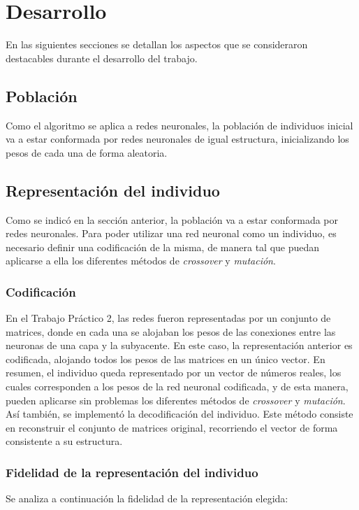 \documentclass{article}
\begin{document}
\section{Desarrollo}

En las siguientes secciones se detallan los aspectos que se consideraron destacables durante el desarrollo del trabajo.

\subsection{Población}

Como el algoritmo se aplica a redes neuronales, la población de individuos inicial va a estar conformada por redes neuronales de igual
estructura, inicializando los pesos de cada una de forma aleatoria.

\subsection{Representación del individuo}
Como se indicó en la sección anterior, la población va a estar conformada por redes neuronales. Para poder utilizar una red neuronal
como un individuo, es necesario definir una codificación de la misma, de manera tal que puedan aplicarse a ella los diferentes
métodos de \emph{crossover} y \emph{mutación}.

\subsubsection{Codificación}
En el Trabajo Práctico 2, las redes fueron representadas por un conjunto de matrices, donde en cada una se alojaban los pesos
de las conexiones entre las neuronas de una capa y la subyacente. En este caso, la representación anterior es codificada, alojando todos los pesos
de las matrices en un único vector. En resumen, el individuo queda representado por un vector de números reales, los cuales corresponden
a los pesos de la red neuronal codificada, y de esta manera, pueden aplicarse sin problemas los diferentes métodos de \emph{crossover} 
y \emph{mutación}.\\

Así también, se implementó la decodificación del individuo. Este método consiste en reconstruir el conjunto de matrices original, recorriendo
el vector de forma consistente a su estructura.

\subsubsection{Fidelidad de la representación del individuo}
Se analiza a continuación la fidelidad de la representación elegida:
\end{document}
